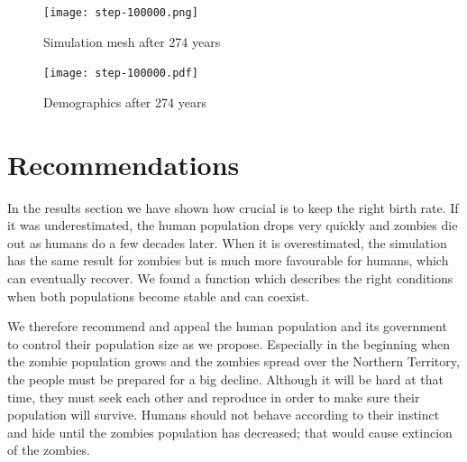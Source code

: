 \documentclass[a4paper]{article}
\begin{document}
\begin{figure}[pht]
    \centering
    \texttt{[image: step-100000.png]}
    \caption{Simulation mesh after 274 years}
    \texttt{[image: step-100000.pdf]}
    \caption{Demographics after 274 years}
\end{figure}

\section{Recommendations}

In the results section we have shown how crucial is to keep the right birth rate.
If it was underestimated, the human population drops very quickly and zombies die out as humans do a few decades later.
When it is overestimated, the simulation has the same result for zombies but is much more favourable for humans, which can eventually recover.
We found a function which describes the right conditions when both populations become stable and can coexist.

We therefore recommend and appeal the human population and its government to control their population size as we propose.
Especially in the beginning when the zombie population grows and the zombies spread over the Northern Territory, the people must be prepared for a big decline.
Although it will be hard at that time, they must seek each other and reproduce in order to make sure their population will survive.
Humans should not behave according to their instinct and hide until the zombies population has decreased; that would cause extincion of the zombies.





\begingroup
\raggedright



\endgroup
\end{document}
